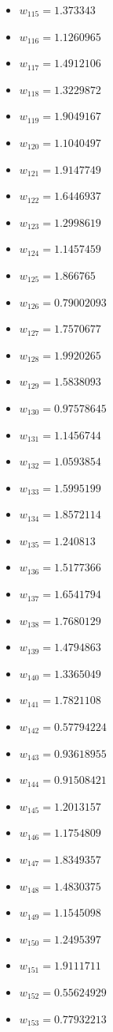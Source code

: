 \documentclass[11pt]{article}
\begin{document}
\begin{itemize}
\item $w_{115} = 1.373343$
\item $w_{116} = 1.1260965$
\item $w_{117} = 1.4912106$
\item $w_{118} = 1.3229872$
\item $w_{119} = 1.9049167$
\item $w_{120} = 1.1040497$
\item $w_{121} = 1.9147749$
\item $w_{122} = 1.6446937$
\item $w_{123} = 1.2998619$
\item $w_{124} = 1.1457459$
\item $w_{125} = 1.866765$
\item $w_{126} = 0.79002093$
\item $w_{127} = 1.7570677$
\item $w_{128} = 1.9920265$
\item $w_{129} = 1.5838093$
\item $w_{130} = 0.97578645$
\item $w_{131} = 1.1456744$
\item $w_{132} = 1.0593854$
\item $w_{133} = 1.5995199$
\item $w_{134} = 1.8572114$
\item $w_{135} = 1.240813$
\item $w_{136} = 1.5177366$
\item $w_{137} = 1.6541794$
\item $w_{138} = 1.7680129$
\item $w_{139} = 1.4794863$
\item $w_{140} = 1.3365049$
\item $w_{141} = 1.7821108$
\item $w_{142} = 0.57794224$
\item $w_{143} = 0.93618955$
\item $w_{144} = 0.91508421$
\item $w_{145} = 1.2013157$
\item $w_{146} = 1.1754809$
\item $w_{147} = 1.8349357$
\item $w_{148} = 1.4830375$
\item $w_{149} = 1.1545098$
\item $w_{150} = 1.2495397$
\item $w_{151} = 1.9111711$
\item $w_{152} = 0.55624929$
\item $w_{153} = 0.77932213$

\end{itemize}
\end{document}
